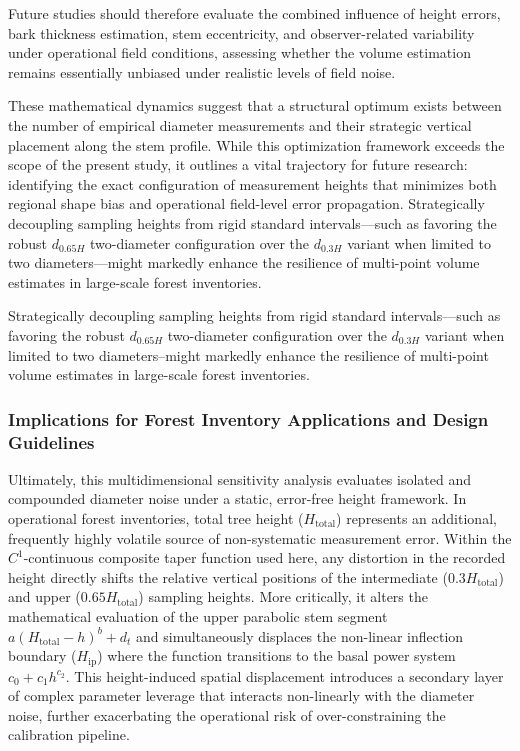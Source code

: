 \documentclass[twocolumn, bibliography=totoc]{scrartcl}
\begin{document}
Future studies should therefore evaluate the combined influence of height errors, bark thickness estimation, stem eccentricity, and observer-related variability under operational field conditions, assessing whether the volume estimation remains essentially unbiased under realistic levels of field noise.

These mathematical dynamics suggest that a structural optimum exists between the number of empirical diameter measurements and their strategic vertical placement along the stem profile. While this optimization framework exceeds the scope of the present study, it outlines a vital trajectory for future research: identifying the exact configuration of measurement heights that minimizes both regional shape bias and operational field-level error propagation. Strategically decoupling sampling heights from rigid standard intervals---such as favoring the robust $d_{0.65H}$ two-diameter configuration over the $d_{0.3H}$ variant when limited to two diameters---might markedly enhance the resilience of multi-point volume estimates in large-scale forest inventories.

Strategically decoupling sampling heights from rigid standard intervals---such as favoring the robust $d_{0.65H}$ two-diameter configuration over the $d_{0.3H}$ variant when limited to two diameters--might markedly enhance the resilience of multi-point volume estimates in large-scale forest inventories.

\subsubsection{Implications for Forest Inventory Applications and Design Guidelines}

Ultimately, this multidimensional sensitivity analysis evaluates isolated and compounded diameter noise under a static, error-free height framework. In operational forest inventories, total tree height ($H_{\text{total}}$) represents an additional, frequently highly volatile source of non-systematic measurement error. Within the $C^1$-continuous composite taper function used here, any distortion in the recorded height directly shifts the relative vertical positions of the intermediate ($0.3H_{\text{total}}$) and upper ($0.65H_{\text{total}}$) sampling heights. More critically, it alters the mathematical evaluation of the upper parabolic stem segment $a(H_{\text{total}} - h)^b + d_t$ and simultaneously displaces the non-linear inflection boundary ($H_{\text{ip}}$) where the function transitions to the basal power system $c_0 + c_1 h^{c_2}$. This height-induced spatial displacement introduces a secondary layer of complex parameter leverage that interacts non-linearly with the diameter noise, further exacerbating the operational risk of over-constraining the calibration pipeline.
\end{document}

